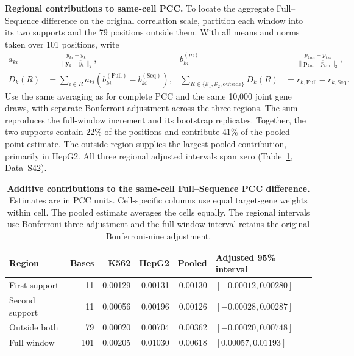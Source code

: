 \documentclass[11pt,a4paper]{article}
\newcommand{\tableid}[1]{\setcounter{table}{\numexpr#1-1\relax}}
\newcommand{\tref}[1]{Table~\ref{#1}}
\newcommand{\data}[1]{\hyperref[data:S#1]{Data~S#1}}
\begin{document}
\textbf{Regional contributions to same-cell PCC.}
To locate the aggregate Full--Sequence difference on the original correlation scale, partition each window into its two supports and the 79 positions outside them. With all means and norms taken over 101 positions, write
\begin{equation}\label{eq:regional-pcc}
\begin{aligned}
a_{ki}&=\frac{y_{ki}-\bar y_k}{\lVert \boldsymbol y_k-\bar y_k\rVert_2},&
b^{(m)}_{ki}&=\frac{p_{kmi}-\bar p_{km}}{\lVert\boldsymbol p_{km}-\bar p_{km}\rVert_2},\\
D_k(R)&=\sum_{i\in R} a_{ki}(b^{(\mathrm{Full})}_{ki}-b^{(\mathrm{Seq})}_{ki}),&
\sum_{R\in\{\mathcal S_1,\mathcal S_2,\mathrm{outside}\}}D_k(R)
&=r_{k,\mathrm{Full}}-r_{k,\mathrm{Seq}}.
\end{aligned}
\end{equation}
Use the same averaging as for complete PCC and the same 10,000 joint gene draws, with separate Bonferroni adjustment across the three regions. The sum reproduces the full-window increment and its bootstrap replicates. Together, the two supports contain 22\% of the positions and contribute 41\% of the pooled point estimate. The outside region supplies the largest pooled contribution, primarily in HepG2. All three regional adjusted intervals span zero (\tref{tab:regional-pcc}, \data{42}).

\tableid{26}
\begin{table}[H]\centering\small
\caption{\textbf{Additive contributions to the same-cell Full--Sequence PCC difference.}
Estimates are in PCC units. Cell-specific columns use equal target-gene weights within cell. The pooled estimate averages the cells equally. The regional intervals use Bonferroni-three adjustment and the full-window interval retains the original Bonferroni-nine adjustment.}
\label{tab:regional-pcc}
\setlength{\tabcolsep}{5pt}
\begin{tabular}{@{}lrrrrl@{}}
\toprule
Region & Bases & K562 & HepG2 & Pooled & Adjusted 95\% interval \\
\midrule
First support & 11 & 0.00129 & 0.00131 & 0.00130 & $[-0.00012, 0.00280]$\\
Second support & 11 & 0.00056 & 0.00196 & 0.00126 & $[-0.00028, 0.00287]$\\
Outside both & 79 & 0.00020 & 0.00704 & 0.00362 & $[-0.00020, 0.00748]$\\
\midrule
Full window & 101 & 0.00205 & 0.01030 & 0.00618 & $[0.00057, 0.01193]$\\
\bottomrule
\end{tabular}
\end{table}
\end{document}
